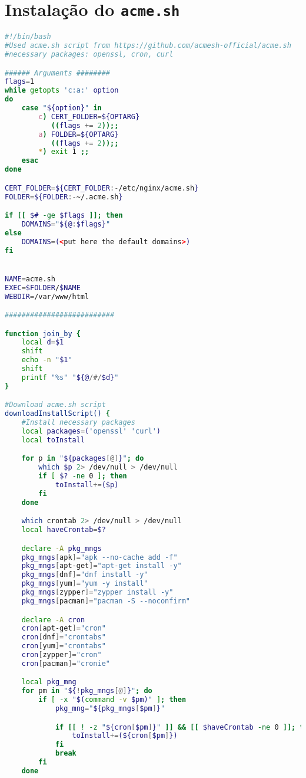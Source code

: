 \section{Instalação do \texttt{acme.sh}}\label{script:acme}
\begin{lstlisting}[language=bash, caption=\textit{Script} de instalação do \texttt{acme.sh}]
#!/bin/bash
#Used acme.sh script from https://github.com/acmesh-official/acme.sh
#necessary packages: openssl, cron, curl

###### Arguments ########
flags=1
while getopts 'c:a:' option
do
    case "${option}" in
        c) CERT_FOLDER=${OPTARG}
           ((flags += 2));;
        a) FOLDER=${OPTARG}
           ((flags += 2));;
        *) exit 1 ;;
    esac
done

CERT_FOLDER=${CERT_FOLDER:-/etc/nginx/acme.sh}
FOLDER=${FOLDER:-~/.acme.sh}

if [[ $# -ge $flags ]]; then
    DOMAINS="${@:$flags}"
else
    DOMAINS=(<put here the default domains>)
fi


NAME=acme.sh
EXEC=$FOLDER/$NAME
WEBDIR=/var/www/html

##########################

function join_by {
    local d=$1
    shift
    echo -n "$1"
    shift
    printf "%s" "${@/#/$d}"
}

#Download acme.sh script
downloadInstallScript() {
    #Install necessary packages
    local packages=('openssl' 'curl')
    local toInstall

    for p in "${packages[@]}"; do
        which $p 2> /dev/null > /dev/null
        if [ $? -ne 0 ]; then
            toInstall+=($p)
        fi
    done

    which crontab 2> /dev/null > /dev/null
    local haveCrontab=$?

    declare -A pkg_mngs
    pkg_mngs[apk]="apk --no-cache add -f"
    pkg_mngs[apt-get]="apt-get install -y"
    pkg_mngs[dnf]="dnf install -y"
    pkg_mngs[yum]="yum -y install"
    pkg_mngs[zypper]="zypper install -y"
    pkg_mngs[pacman]="pacman -S --noconfirm"

    declare -A cron
    cron[apt-get]="cron"
    cron[dnf]="crontabs"
    cron[yum]="crontabs"
    cron[zypper]="cron"
    cron[pacman]="cronie"

    local pkg_mng
    for pm in "${!pkg_mngs[@]}"; do
        if [ -x "$(command -v $pm)" ]; then
            pkg_mng="${pkg_mngs[$pm]}"

            if [[ ! -z "${cron[$pm]}" ]] && [[ $haveCrontab -ne 0 ]]; then
                toInstall+=(${cron[$pm]})
            fi
            break
        fi
    done


\end{lstlisting}
